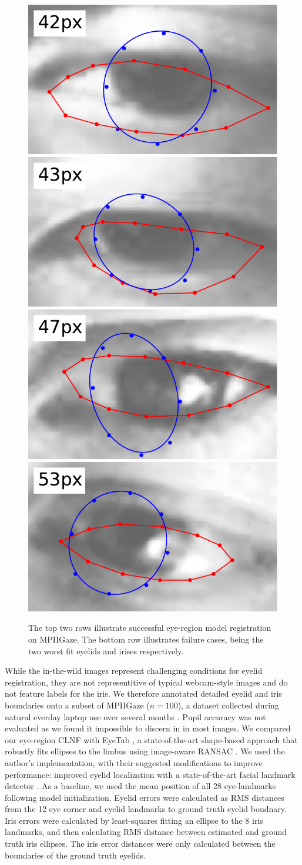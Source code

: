 \begin{figure}
    \par \vspace{0.1em}
    \includegraphics[width=0.244\columnwidth]{figs/ldmks_examples/idx_84.pdf}\hfill
    \includegraphics[width=0.244\columnwidth]{figs/ldmks_examples/idx_89.pdf}\hfill
    \includegraphics[width=0.244\columnwidth]{figs/ldmks_examples/idx_26.pdf}\hfill
    \includegraphics[width=0.244\columnwidth]{figs/ldmks_examples/idx_81.pdf}
    \caption{The top two rows illustrate successful eye-region model registration on MPIIGaze. The bottom row illustrates failure cases, being the two worst fit eyelids and irises respectively.}
    \label{fig:clnf_results}
\end{figure}

While the in-the-wild images represent challenging conditions for eyelid registration, they are not representitive of typical webcam-style images and do not feature labels for the iris.
We therefore annotated detailed eyelid and iris boundaries onto a subset of MPIIGaze ($n\!=\!100$), a dataset collected during natural everday laptop use over several months \cite{zhang15_cvpr}.
Pupil accuracy was not evaluated as we found it impossible to discern in in most images.
We compared our eye-region CLNF with EyeTab \cite{wood2014eyetab}, a state-of-the-art shape-based approach that robustly fits ellipses to the limbus using image-aware RANSAC \cite{swirski2012robust}.
We used the author's implementation, with their suggested modifications to improve performance: improved eyelid localization with a state-of-the-art facial landmark detector \cite{baltrusaitis2013constrained}.
As a baseline, we used the mean position of all 28 eye-landmarks following model initialization.
Eyelid errors were calculated as RMS distances from the 12 eye corner and eyelid landmarks to ground truth eyelid boudnary.
Iris errors were calculated by least-squares fitting an ellipse to the 8 iris landmarks, and then calculating RMS distance between estimated and ground truth iris ellipses.
The iris error distances were only calculated between the boundaries of the ground truth eyelids.

